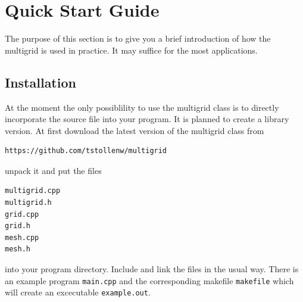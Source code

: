\chapter{Quick Start Guide}\label{chapter:quick_start_guide}
The purpose of this section is to give you a brief introduction of how the multigrid is used in practice. It may suffice for the most applications.

\section{Installation}
At the moment the only possiblility to use the multigrid class is to directly incorporate the source file into your program. It is planned to create a library version. At first download the latest version of the multigrid class from
\begin{lstlisting}[language=bash]
https://github.com/tstollenw/multigrid
\end{lstlisting}
unpack it and put the files
\begin{lstlisting}
multigrid.cpp
multigrid.h
grid.cpp
grid.h
mesh.cpp
mesh.h
\end{lstlisting}
into your program directory. Include and link the files in the usual way. There is an example program \texttt{main.cpp} and the corresponding makefile \texttt{makefile} which will create an excecutable \texttt{example.out}.

